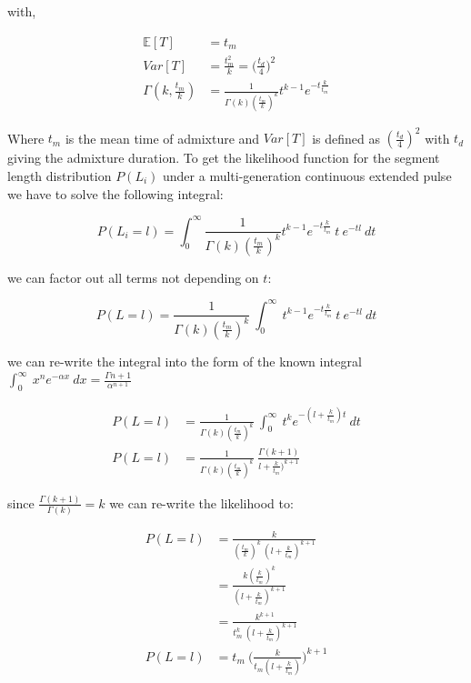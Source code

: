 \documentclass[]{article}
\begin{document}
with,

\begin{equation}
\begin{split}
\label{eq:RV_extended_pulse_properties}
\mathbb{E}[T]&=t_{m} \\
Var[T]&=\frac{t_{m}^2}{k} = \bigg(\frac{t_d}{4} \bigg)^2  \\
\Gamma(k,\frac{t_m}{k})&= \frac{1}{\Gamma(k)(\frac{t_m}{k})^k}t^{k-1}e^{-t\frac{k}{t_m}}
\end{split}
\end{equation}

Where $t_{m}$ is the mean time of admixture and $Var[T]$ is defined as $(\frac{t_d}{4})^2$ with $t_{d}$ giving the admixture duration.
To get the likelihood function for the segment length distribution $P(L_i)$ under a multi-generation continuous extended pulse we have to solve the following integral:

\begin{equation}
\label{eq:Likelihood_function_extended_pulse_1}
    P(L_i=l) = \int_{0}^{\infty} \frac{1}{\Gamma(k)(\frac{t_m}{k})^k}t^{k-1}e^{-t\frac{k}{t_m}}\ t\ e^{-tl} \ dt 
\end{equation}

we can factor out all terms not depending on $t$:

\begin{equation}
\label{eq:Likelihood_function_extended_pulse_2}
    P(L=l) = \frac{1}{\Gamma(k)(\frac{t_m}{k})^k}\ \int_{0}^{\infty}\ t^{k-1}e^{-t\frac{k}{t_m}}\ t\ e^{-tl} \ dt 
\end{equation}

we can re-write the integral into the  form of the known integral $\int_{0}^{\infty}\ x^n e^{-\alpha x} \ dx= \frac{\Gamma{n+1}}{\alpha^{n+1}}$

\begin{equation}
\begin{split}
\label{eq:Likelihood_function_extended_pulse_3}
    P(L=l) &= \frac{1}{\Gamma(k)(\frac{t_m}{k})^k}\ \int_{0}^{\infty}\ t^{k}e^{-(l+\frac{k}{t_m})t} \ dt \\ 
    P(L=l) &= \frac{1}{\Gamma(k)(\frac{t_m}{k})^k}\ \frac{\Gamma(k+1)}{l+\frac{k}{t_m})^{k+1}} 
\end{split}
\end{equation}

since $\frac{\Gamma(k+1)}{\Gamma(k)} =k$ we can re-write the likelihood to:

\begin{equation}
\begin{split}
\label{eq:Likelihood_function_extended_pulse_final}
    P(L=l) &= \frac{k}{(\frac{t_m}{k})^k \ (l+\frac{k}{t_m})^{k+1}} \\
    &= \frac{k(\frac{k}{t_m})^k} {(l+\frac{k}{t_{m}})^{k+1}}  \\
    &= \frac{k^{k+1}} { t_{m}^k \ (l+\frac{k}{t_{m}})^{k+1}}  \\
    P(L=l) &= t_{m} \ \Bigg( \frac{k}{t_{m}(l+\frac{k}{t_{m}})}\Bigg)^{k+1}
\end{split}
\end{equation}
\end{document}
